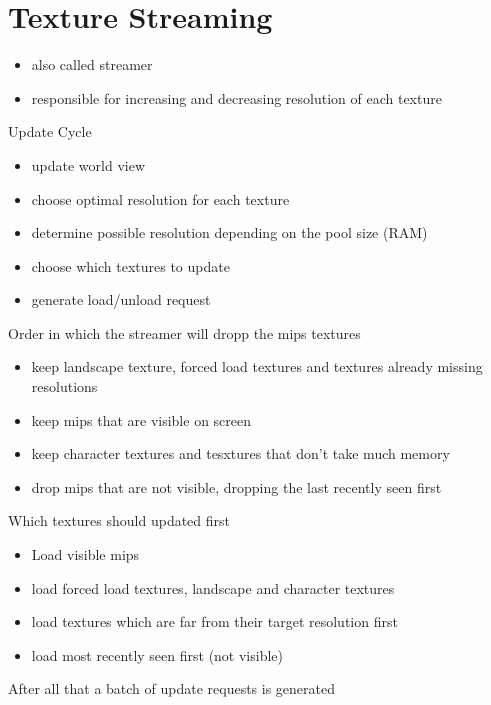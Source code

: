\documentclass{scrbook}
\begin{document}
                \section{Texture Streaming}
                    \begin{itemize}
                        \item also called streamer
                        \item responsible for increasing and decreasing resolution of each texture
                    \end{itemize}
        \smallskip
                    Update Cycle
                    \begin{itemize}
                        \item update world view
                        \item choose optimal resolution for each texture
                        \item determine possible resolution depending on the pool size (RAM)
                        \item choose which textures to update
                        \item generate load/unload request
                    \end{itemize}
        \smallskip
                    Order in which the streamer will dropp the mips textures
                    \begin{itemize}
                        \item keep landscape texture, forced load textures and textures already missing resolutions
                        \item keep mips that are visible on screen
                        \item keep character textures and tesxtures that don't take much memory
                        \item drop mips that are not visible, dropping the last recently seen first
                    \end{itemize}
        \smallskip
                    Which textures should updated first
                    \begin{itemize}
                        \item Load visible mips
                        \item load forced load textures, landscape and character textures
                        \item load textures which are far from their target resolution first
                        \item load most recently seen first (not visible)
                    \end{itemize}
        \bigskip
                    After all that a batch of update requests is generated            
        
\end{document}
